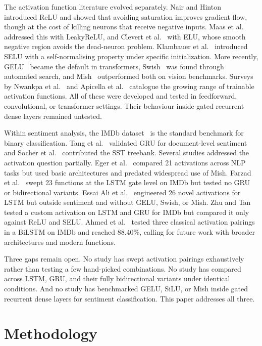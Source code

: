 \documentclass[conference]{IEEEtran}
\begin{document}
The activation function literature evolved separately. Nair
and Hinton~\cite{nair2010} introduced ReLU and showed that avoiding
saturation improves gradient flow, though at the cost of
killing neurons that receive negative inputs. Maas et al.~\cite{maas2013}
addressed this with LeakyReLU, and Clevert et al.~\cite{clevert2015} with
ELU, whose smooth negative region avoids the dead-neuron
problem. Klambauer et al.~\cite{klambauer2017} introduced SELU with a
self-normalising property under specific initialization. More recently,
GELU~\cite{hendrycks2016} became the default in transformers, Swish~\cite{ramachandran2017} was
found through automated search, and Mish~\cite{misra2020} outperformed
both on vision benchmarks. Surveys by Nwankpa et al.~\cite{nwankpa2018}
and Apicella et al.~\cite{apicella2021} catalogue the growing range of
trainable activation functions. All of these were developed and
tested in feedforward, convolutional, or transformer settings.
Their behaviour inside gated recurrent dense layers remained
untested.

Within sentiment analysis, the IMDb dataset~\cite{maas2011} is the
standard benchmark for binary classification. Tang et al.~\cite{tang2015}
validated GRU for document-level sentiment and Socher et
al.~\cite{socher2013} contributed the SST treebank. Several studies addressed
the activation question partially. Eger et al.~\cite{eger2018} compared 21
activations across NLP tasks but used basic architectures and
predated widespread use of Mish. Farzad et al.~\cite{farzad2019} swept 23
functions at the LSTM gate level on IMDb but tested no GRU
or bidirectional variants. Essai Ali et al.~\cite{essaiAli2022} engineered 26
novel activations for LSTM but outside sentiment and without
GELU, Swish, or Mish. Zhu and Tan~\cite{zhu2022} tested a custom
activation on LSTM and GRU for IMDb but compared it
only against ReLU and SELU. Ahmed et al.~\cite{ahmed2025} tested three
classical activation pairings in a BiLSTM on IMDb and reached
88.40\%, calling for future work with broader architectures and
modern functions.

Three gaps remain open. No study has swept activation
pairings exhaustively rather than testing a few hand-picked
combinations. No study has compared across LSTM, GRU,
and their fully bidirectional variants under identical conditions.
And no study has benchmarked GELU, SiLU, or Mish inside
gated recurrent dense layers for sentiment classification. This
paper addresses all three.

\FloatBarrier
\section{Methodology}
\end{document}

